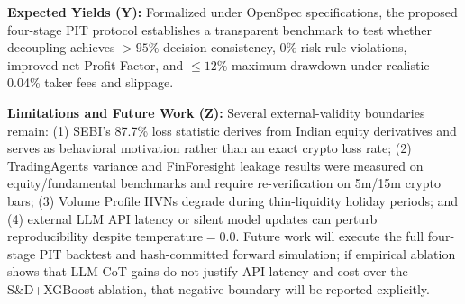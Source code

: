 \documentclass[conference]{IEEEtran}
\begin{document}
\textbf{Expected Yields (Y):} Formalized under OpenSpec specifications, the proposed four-stage PIT protocol establishes a transparent benchmark to test whether decoupling achieves $>95\%$ decision consistency, $0\%$ risk-rule violations, improved net Profit Factor, and $\le 12\%$ maximum drawdown under realistic 0.04\% taker fees and slippage.

\textbf{Limitations and Future Work (Z):} Several external-validity boundaries remain: (1) SEBI's 87.7\% loss statistic derives from Indian equity derivatives and serves as behavioral motivation rather than an exact crypto loss rate; (2) TradingAgents variance \cite{koviazin2026} and FinForesight leakage results \cite{finforesight2026} were measured on equity/fundamental benchmarks and require re-verification on 5m/15m crypto bars; (3) Volume Profile HVNs degrade during thin-liquidity holiday periods; and (4) external LLM API latency or silent model updates can perturb reproducibility despite $\text{temperature}=0.0$. Future work will execute the full four-stage PIT backtest and hash-committed forward simulation; if empirical ablation shows that LLM CoT gains do not justify API latency and cost over the S\&D+XGBoost ablation, that negative boundary will be reported explicitly.
\end{document}
